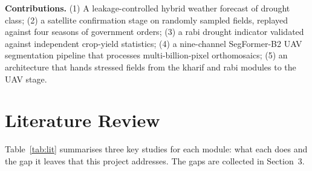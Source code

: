 \documentclass[11pt,a4paper,oneside]{article}
\begin{document}
\textbf{Contributions.} (1) A leakage-controlled hybrid weather forecast of drought class; (2) a satellite confirmation stage on randomly sampled fields, replayed against four seasons of government orders; (3) a rabi drought indicator validated against independent crop-yield statistics; (4) a nine-channel SegFormer-B2 UAV segmentation pipeline that processes multi-billion-pixel orthomosaics; (5) an architecture that hands stressed fields from the kharif and rabi modules to the UAV stage.

\section{Literature Review}
Table~\ref{tab:lit} summarises three key studies for each module: what each does and the gap it leaves that this project addresses. The gaps are collected in Section~3.
\end{document}
